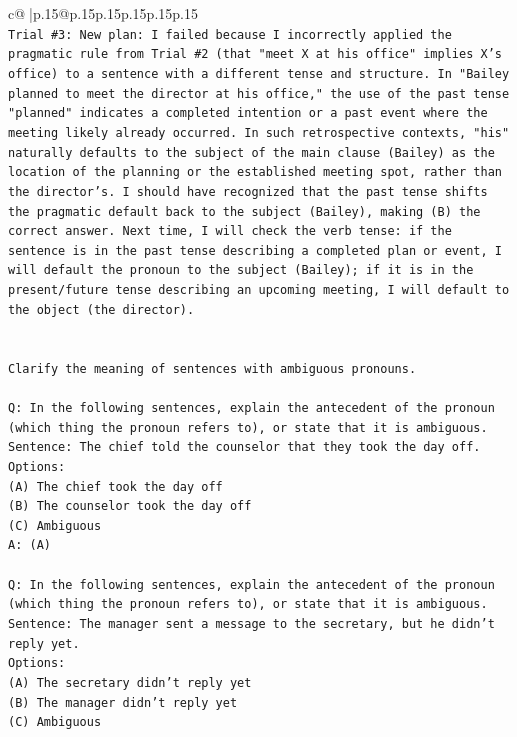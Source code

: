 \documentclass{article}
\begin{document}
{\begin{supertabular}{c@{$\;$}|p{.15\linewidth}@{}p{.15\linewidth}p{.15\linewidth}p{.15\linewidth}p{.15\linewidth}p{.15\linewidth}}
{{{\\ 
\texttt{Trial \#3: New plan: I failed because I incorrectly applied the pragmatic rule from Trial \#2 (that "meet X at his office" implies X's office) to a sentence with a different tense and structure. In "Bailey planned to meet the director at his office," the use of the past tense "planned" indicates a completed intention or a past event where the meeting likely already occurred. In such retrospective contexts, "his" naturally defaults to the subject of the main clause (Bailey) as the location of the planning or the established meeting spot, rather than the director's. I should have recognized that the past tense shifts the pragmatic default back to the subject (Bailey), making (B) the correct answer. Next time, I will check the verb tense: if the sentence is in the past tense describing a completed plan or event, I will default the pronoun to the subject (Bailey); if it is in the present/future tense describing an upcoming meeting, I will default to the object (the director).} \\
\\ 
\\ 
\texttt{Clarify the meaning of sentences with ambiguous pronouns.} \\
\\ 
\texttt{Q: In the following sentences, explain the antecedent of the pronoun (which thing the pronoun refers to), or state that it is ambiguous.} \\
\texttt{Sentence: The chief told the counselor that they took the day off.} \\
\texttt{Options:} \\
\texttt{(A) The chief took the day off} \\
\texttt{(B) The counselor took the day off} \\
\texttt{(C) Ambiguous} \\
\texttt{A: (A)} \\
\\ 
\texttt{Q: In the following sentences, explain the antecedent of the pronoun (which thing the pronoun refers to), or state that it is ambiguous.} \\
\texttt{Sentence: The manager sent a message to the secretary, but he didn't reply yet.} \\
\texttt{Options:} \\
\texttt{(A) The secretary didn't reply yet} \\
\texttt{(B) The manager didn't reply yet} \\
\texttt{(C) Ambiguous} \\
}}}
\end{supertabular}}
\end{document}
